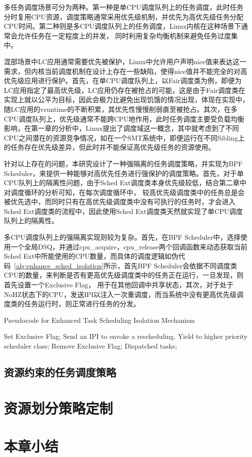 多任务调度场景可分为两种。第一种是单CPU调度队列上的任务调度，此时任务分时复用CPU资源，调度策略通常采用优先级机制，并优先为高优先级任务分配CPU时间。第二种则是多CPU调度队列上的任务调度，Linux内核在这种场景下通常会允许任务在一定程度上的并发， 同时利用复杂均衡机制来避免任务过度集中。

混部场景中LC应用通常需要优先被保护，Linux中允许用户声明nice值来表达这一需求，但内核当前调度机制在设计上存在一些缺陷，使得nice值并不能完全的对高优先级应用进行保护。首先，在单CPU调度队列上，以Fair调度类为例，即便为LC应用指定了最高优先级，LC应用仍存在被抢占的可能，这是由于Fair调度类在实现上就以公平为目标，因此会极力比避免出现饥饿的情况出现，体现在实现中，随LC应用的vruntime的不断积累，其优先性慢慢削弱直至被抢占。其次，在多CPU调度队列上，优先级通常不能跨CPU地作用，此时任务调度主要受负载均衡影响，在第一章的分析中，Linux提出了调度域这一概念，其中就考虑到了不同CPU之间潜在的资源竞争情况，如在一个SMT系统中，即便运行在不同Sibling上的任务存在优先级差异，但此时并不能保证高优先级任务的资源使用。

针对以上存在的问题，本研究设计了一种强隔离的任务调度策略，并实现为BPF Scheduler，来提供一种能够对高优先任务进行强保护的调度策略。首先，对于单CPU队列上的隔离性问题，由于Sched Ext调度类本身优先级较低，结合第二章中对调度循环的分析可知，在每次调度循环中， 较高优先级调度类中的任务总是会被优先选中，而同时只有在高优先级调度类中没有可执行的任务时，才会进入Sched Ext调度类的流程中，因此使用Sched Ext调度类天然就实现了单CPU调度队列上的隔离性。

多CPU调度队列上的强隔离实现则较为复杂。首先，在BPF Scheduler中，选择使用一个全局DSQ，并通过cpu\_acquire，cpu\_release两个回调函数来动态获取当前Sched Ext中所能使用的CPU数量，而具体的调度逻辑如伪代码~\ref{alg:enhance_sched_isolation}所示，首先BPF Scheduler会依据不同调度类CPU的数量，来判断是否有更高优先级调度类中的任务正在运行，一旦发现，则首先设置一个Exclusive Flag， 用于在其他回调中共享状态，其次，对于处于NoHZ状态下的CPU，发送IPI以注入一次重调度，而当系统中没有更高优先级调度类的任务运行时，则正常进行任务的分发。

\begin{algorithm}
    \caption{Pseudocode for Enhanced Task Scheduling Isolation Mechanism}
    \label{alg:enhance_sched_isolation}
    \begin{algorithmic}[1]
            \State Set Exclusive Flag;
                \State Send an IPI to envoke a rescheduling.
            \EndFor
            \State Yield to higher priority scheduler class;
        \EndIf
        \State Remove Exclusive Flag;
        \State Dispatched tasks;
    \EndWhile
    \end{algorithmic}
\end{algorithm}

\subsection{资源约束的任务调度策略}


\section{资源划分策略定制}

\section{本章小结}